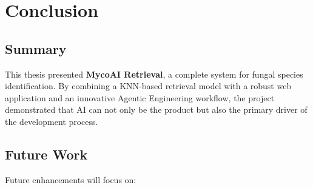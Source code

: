 \section{Conclusion}\label{chapter-5-conclusion}

\subsection{Summary}\label{summary-evaluation}

This thesis presented \textbf{MycoAI Retrieval}, a complete system for fungal species identification. By combining a KNN-based retrieval model with a robust web application and an innovative Agentic Engineering workflow, the project demonstrated that AI can not only be the product but also the primary driver of the development process.

\subsection{Future Work}\label{future-work}

Future enhancements will focus on:

